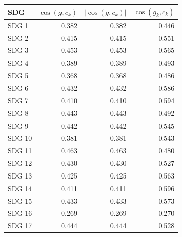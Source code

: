 \begin{tabular}{lrrr}
\toprule
SDG & $\cos(g, c_k)$ & $|\cos(g, c_k)|$ & $\cos(g_k, c_k)$ \\
\midrule
SDG 1 & 0.382 & 0.382 & 0.446 \\
SDG 2 & 0.415 & 0.415 & 0.551 \\
SDG 3 & 0.453 & 0.453 & 0.565 \\
SDG 4 & 0.389 & 0.389 & 0.493 \\
SDG 5 & 0.368 & 0.368 & 0.486 \\
SDG 6 & 0.432 & 0.432 & 0.586 \\
SDG 7 & 0.410 & 0.410 & 0.594 \\
SDG 8 & 0.443 & 0.443 & 0.492 \\
SDG 9 & 0.442 & 0.442 & 0.545 \\
SDG 10 & 0.381 & 0.381 & 0.543 \\
SDG 11 & 0.463 & 0.463 & 0.480 \\
SDG 12 & 0.430 & 0.430 & 0.527 \\
SDG 13 & 0.425 & 0.425 & 0.563 \\
SDG 14 & 0.411 & 0.411 & 0.596 \\
SDG 15 & 0.433 & 0.433 & 0.573 \\
SDG 16 & 0.269 & 0.269 & 0.270 \\
SDG 17 & 0.444 & 0.444 & 0.528 \\
\bottomrule
\end{tabular}
